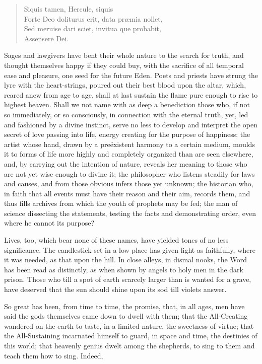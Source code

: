 \begin{verse}
\vin Siquis tamen, Hercule, siquis\\
Forte Deo doliturus erit, data pr\ae mia nollet,\\
Sed meruise dari sciet, invitua que probabit,\\
\vin Assensere Dei.
\end{verse}

Sages and lawgivers have bent their whole nature to the search for
truth, and thought themselves happy if they could buy, with the
sacrifice of all temporal ease and pleasure, one seed for the future
Eden. Poets and priests have strung the lyre with the heart-strings,
poured out their best blood upon the altar, which, reared anew
 from age to age, shall at last sustain the flame pure enough
to rise to highest heaven. Shall we not name with as deep a
benediction those who, if not so immediately, or so consciously, in
connection with the eternal truth, yet, led and fashioned by a divine
instinct, serve no less to develop and interpret the open secret of
love passing into life, energy creating for the purpose of happiness;
the artist whose hand, drawn by a pre\"{e}xistent harmony to a certain
medium, moulds it to forms of life more highly and completely
organized than are seen elsewhere, and, by carrying out the intention
of nature, reveals her meaning to those who are not yet wise enough to
divine it; the philosopher who listens steadily for laws and causes,
and from those obvious infers those yet unknown; the historian who, in
faith that all events must have their reason and their aim, records
them, and thus fills archives from which the youth of prophets may be
fed; the man of science dissecting the statements, testing the facts
and demonstrating order, even where he cannot its purpose?

Lives, too, which bear none of these names, have yielded tones of no
less significance. The candlestick set in a low place has given light
as faithfully, where it was needed, as that upon the hill. In close
alleys, in dismal nooks, the Word has been read as distinctly, as when
shown by angels to holy men in the dark prison. Those who till a spot
of earth scarcely larger than is wanted for a grave, have deserved
that the sun should shine upon its sod till violets answer.

So great has been, from time to time, the promise,  that, in
all ages, men have said the gods themselves came down to dwell with
them; that the All-Creating wandered on the earth to taste, in a
limited nature, the sweetness of virtue; that the All-Sustaining
incarnated himself to guard, in space and time, the destinies of this
world; that heavenly genius dwelt among the shepherds, to sing to them
and teach them how to sing. Indeed,

